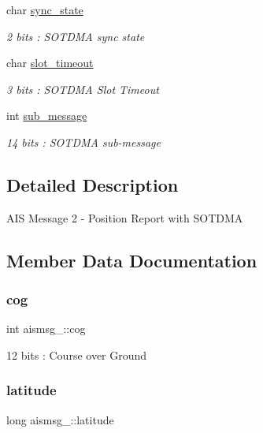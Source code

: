 \begin{DoxyCompactItemize}
char \mbox{\hyperlink{structaismsg__2_a2ead7286be168983aa969df7ff023150}{sync\+\_\+state}}
\begin{DoxyCompactList}\small\item\em 2 bits \+: S\+O\+T\+D\+MA sync state \end{DoxyCompactList}\item 
char \mbox{\hyperlink{structaismsg__2_a5a592589ba16571e308dbea3dd5112e4}{slot\+\_\+timeout}}
\begin{DoxyCompactList}\small\item\em 3 bits \+: S\+O\+T\+D\+MA Slot Timeout \end{DoxyCompactList}\item 
int \mbox{\hyperlink{structaismsg__2_acb516398aaa2f3c9e386ed1212edf331}{sub\+\_\+message}}
\begin{DoxyCompactList}\small\item\em 14 bits \+: S\+O\+T\+D\+MA sub-\/message \end{DoxyCompactList}\end{DoxyCompactItemize}


\subsection{Detailed Description}
A\+IS Message 2 -\/ Position Report with S\+O\+T\+D\+MA 

\subsection{Member Data Documentation}
\mbox{\label{structaismsg__2_a9f41728f55cd8b7f3c8c811b149297ff}} 
\subsubsection{\texorpdfstring{cog}{cog}}
{\footnotesize\ttfamily int aismsg\+\_\+::cog}



12 bits \+: Course over Ground 

\mbox{\label{structaismsg__2_ab3d9d1e6326b92c11bcc22cc710797d8}} 
\subsubsection{\texorpdfstring{latitude}{latitude}}
{\footnotesize\ttfamily long aismsg\+\_\+::latitude}



